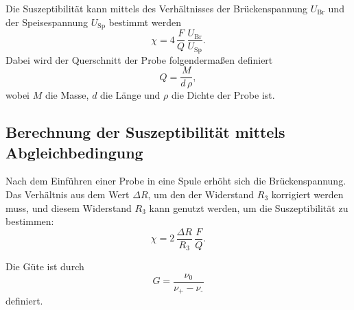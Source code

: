 \noindent Die Suszeptibilität kann mittels des Verhältnisses der Brückenspannung $U_\text{Br}$
und der Speisespannung $U_\text{Sp}$ bestimmt werden
\begin{equation}
    \chi = 4 \, \frac{F}{Q} \, \frac{U_\text{Br}}{U_\text{Sp}}.
    \label{eqn:chiexp1}
\end{equation}
Dabei wird der Querschnitt der Probe folgendermaßen definiert
\begin{equation*}
    Q = \frac{M}{d \, \rho},
\end{equation*}
wobei $M$ die Masse, $d$ die Länge und $\rho$ die Dichte der Probe ist.


\subsection{Berechnung der Suszeptibilität mittels Abgleichbedingung}
Nach dem Einführen einer Probe in eine Spule erhöht sich die Brückenspannung.
Das Verhältnis aus dem Wert $\Delta R$, um den der Widerstand $R_3$ korrigiert werden
muss, und diesem Widerstand $R_3$ kann genutzt werden, um die Suszeptibilität zu 
bestimmen:
\begin{equation}
    \chi = 2 \, \frac{\Delta R}{R_3} \, \frac{F}{Q}.
    \label{eqn:chiexp2}
\end{equation}

Die Güte ist durch
\begin{equation}
    G = \frac{\nu_0}{\nu_\text{+} - \nu_\text{-}}
    \label{eqn:guete}
\end{equation}
definiert.